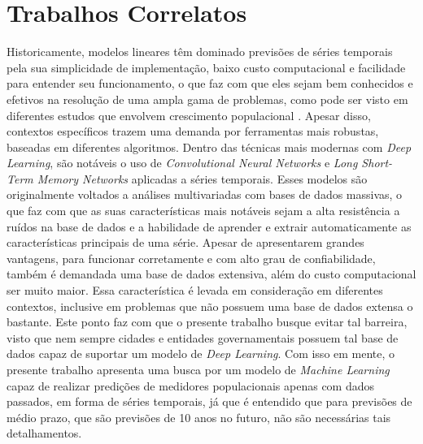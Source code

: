 \section{Trabalhos Correlatos}

Historicamente, modelos lineares têm dominado previsões de séries temporais 
pela sua simplicidade de implementação, baixo custo computacional e facilidade 
para entender seu funcionamento, o que faz com que eles sejam bem conhecidos 
e efetivos na resolução de uma ampla gama de problemas, como pode ser visto 
em diferentes estudos que envolvem crescimento populacional \cite{Alan:5}. Apesar disso, 
contextos específicos trazem uma demanda por ferramentas mais robustas, baseadas 
em diferentes algoritmos. Dentro das técnicas mais modernas com \emph{Deep Learning}, 
são notáveis o uso de \emph{Convolutional Neural Networks} \cite{Ban:3} e \emph{Long Short-Term Memory 
Networks} \cite{Benjamin:4} aplicadas a séries temporais. Esses modelos são originalmente voltados 
a análises multivariadas com bases de dados massivas, o que faz com que as suas 
características mais notáveis sejam a alta resistência a ruídos na base de dados 
e a habilidade de aprender e extrair automaticamente as características principais
de uma série. Apesar de apresentarem grandes vantagens, para funcionar corretamente 
e com alto grau de confiabilidade, também é demandada uma base de dados extensiva, 
além do custo computacional ser muito maior. Essa característica é levada em 
consideração em diferentes contextos, inclusive em problemas que não possuem 
uma base de dados extensa o bastante. Este ponto faz com que o presente trabalho 
busque evitar tal barreira, visto que nem sempre cidades e entidades governamentais 
possuem tal base de dados capaz de suportar um modelo de \emph{Deep Learning}. Com isso 
em mente, o presente trabalho apresenta uma busca por um modelo de \emph{Machine Learning} 
capaz de realizar predições de medidores populacionais apenas com dados passados, 
em forma de séries temporais, já que é entendido que para previsões de médio prazo, 
que são previsões de 10 anos no futuro, não são necessárias tais detalhamentos.

